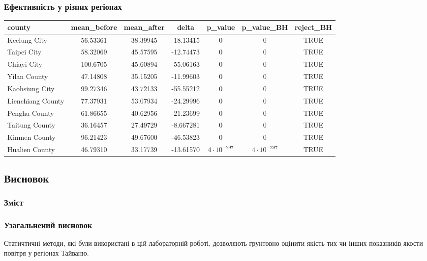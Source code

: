 \documentclass{beamer}
\begin{document}
\begin{frame}
  \frametitle{Ефективність у різних регіонах}

  \begin{tabular}{lcccccc}
    \hline
    county & mean\_before & mean\_after & delta & p\_value & p\_value\_BH & reject\_BH \\
    \hline
    Keelung City      & 56.53361 & 38.39945 & -18.13415 & 0 & 0 & TRUE \\
    Taipei City       & 58.32069 & 45.57595 & -12.74473 & 0 & 0 & TRUE \\
    Chiayi City       & 100.6705 & 45.60894 & -55.06163 & 0 & 0 & TRUE \\
    Yilan County      & 47.14808 & 35.15205 & -11.99603 & 0 & 0 & TRUE \\
    Kaohsiung City    & 99.27346 & 43.72133 & -55.55212 & 0 & 0 & TRUE \\
    Lienchiang County & 77.37931 & 53.07934 & -24.29996 & 0 & 0 & TRUE \\
    Penghu County     & 61.86655 & 40.62956 & -21.23699 & 0 & 0 & TRUE \\
    Taitung County    & 36.16457 & 27.49729 & -8.667281 & 0 & 0 & TRUE \\
    Kinmen County     & 96.21423 & 49.67600 & -46.53823 & 0 & 0 & TRUE \\
    Hualien County    & 46.79310 & 33.17739 & -13.61570 & $4 \cdot 10^{-297}$ & $4 \cdot 10^{-297}$ & TRUE \\
\end{tabular}
\end{frame}


\begin{frame}
  \section{Висновок}

  \frametitle{Зміст}
  \tableofcontents[currentsection]
\end{frame}

\begin{frame}
  \frametitle{Узагальнений висновок}
  Статичтичні методи, які були використані в цій лабораторній роботі, 
  дозволяють грунтовно оцінити якість тих чи інших показників якости повітря у регіонах Тайваню.
  
\end{frame}
\end{document}
